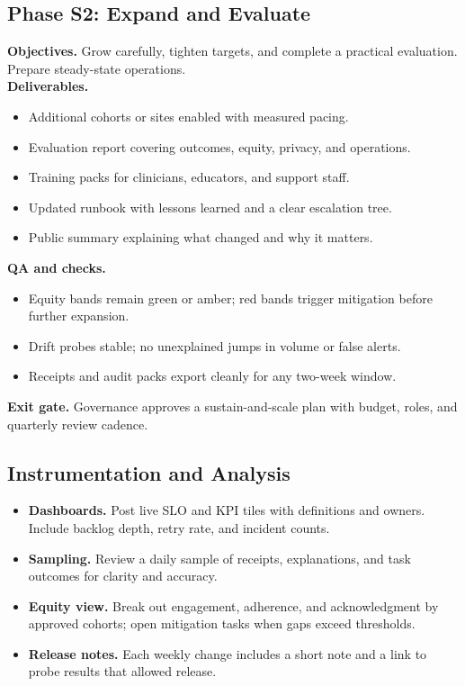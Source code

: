\documentclass[12pt]{article}
\begin{document}
\subsection*{Phase S2: Expand and Evaluate}
\textbf{Objectives.} Grow carefully, tighten targets, and complete a practical evaluation. Prepare steady-state operations.\\
\textbf{Deliverables.}
\begin{itemize}[leftmargin=*]
  \item Additional cohorts or sites enabled with measured pacing.
  \item Evaluation report covering outcomes, equity, privacy, and operations.
  \item Training packs for clinicians, educators, and support staff.
  \item Updated runbook with lessons learned and a clear escalation tree.
  \item Public summary explaining what changed and why it matters.
\end{itemize}
\textbf{QA and checks.}
\begin{itemize}[leftmargin=*]
  \item Equity bands remain green or amber; red bands trigger mitigation before further expansion.
  \item Drift probes stable; no unexplained jumps in volume or false alerts.
  \item Receipts and audit packs export cleanly for any two-week window.
\end{itemize}
\textbf{Exit gate.} Governance approves a sustain-and-scale plan with budget, roles, and quarterly review cadence.

\subsection*{Instrumentation and Analysis}
\begin{itemize}[leftmargin=*]
  \item \textbf{Dashboards.} Post live SLO and KPI tiles with definitions and owners. Include backlog depth, retry rate, and incident counts.
  \item \textbf{Sampling.} Review a daily sample of receipts, explanations, and task outcomes for clarity and accuracy.
  \item \textbf{Equity view.} Break out engagement, adherence, and acknowledgment by approved cohorts; open mitigation tasks when gaps exceed thresholds.
  \item \textbf{Release notes.} Each weekly change includes a short note and a link to probe results that allowed release.
\end{itemize}
\end{document}
